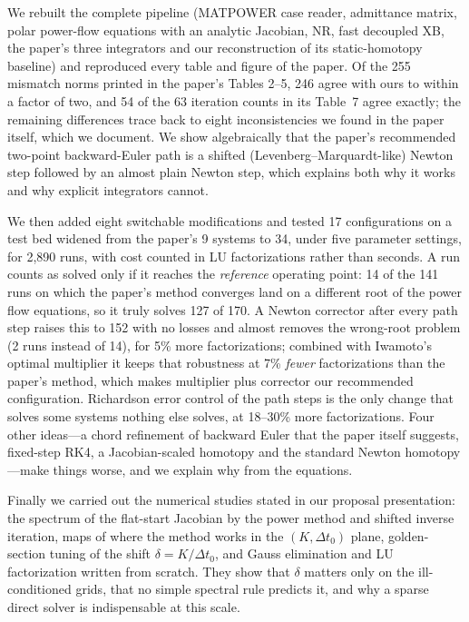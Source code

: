 \documentclass[11pt,a4paper]{article}
\begin{document}
We rebuilt the complete pipeline (MATPOWER case reader, admittance matrix, polar power-flow equations
with an analytic Jacobian, NR, fast decoupled XB, the paper's three integrators and our reconstruction of
its static-homotopy baseline) and reproduced every table and figure of the paper. Of the 255 mismatch norms
printed in the paper's Tables 2--5, 246 agree with ours to within a factor of two, and 54 of the 63
iteration counts in its Table~7 agree exactly; the remaining differences trace back to eight
inconsistencies we found in the paper itself, which we document. We show algebraically that the
paper's recommended two-point backward-Euler path is a shifted (Levenberg--Marquardt-like) Newton step
followed by an almost plain Newton step, which explains both why it works and why explicit integrators
cannot.

We then added eight switchable modifications and tested 17 configurations on a test bed widened from the
paper's 9 systems to 34, under five parameter settings, for 2{,}890 runs, with cost counted in LU
factorizations rather than seconds. A run counts as solved only if it reaches the \emph{reference}
operating point: 14 of the 141 runs on which the paper's method converges land on a different root of the
power flow equations, so it truly solves 127 of 170. A Newton corrector after every path step raises this
to 152 with no losses and almost removes the wrong-root problem (2 runs instead of 14), for 5\% more
factorizations; combined with Iwamoto's optimal multiplier it keeps that robustness at 7\% \emph{fewer}
factorizations than the paper's method, which makes multiplier plus corrector our recommended configuration.
Richardson error control of the path steps is the only change that solves some systems nothing else solves,
at 18--30\% more factorizations. Four other ideas---a chord refinement of backward Euler that the paper itself
suggests, fixed-step RK4, a Jacobian-scaled homotopy and the standard Newton homotopy---make things worse,
and we explain why from the equations.

Finally we carried out the numerical studies stated in our proposal presentation: the spectrum of the flat-start Jacobian by
the power method and shifted inverse iteration, maps of where the method works in the $(K,\Delta t_0)$
plane, golden-section tuning of the shift $\delta=K/\Delta t_0$, and Gauss elimination and LU
factorization written from scratch. They show that $\delta$ matters only on the ill-conditioned grids,
that no simple spectral rule predicts it, and why a sparse direct solver is indispensable at this scale.
\end{document}
